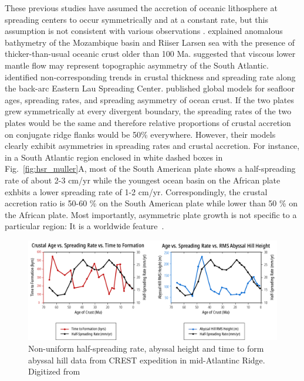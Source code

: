 \documentclass[letterpaper,12pt,notitle]{memphisthesis}                     %
\begin{document}
These previous studies have assumed the accretion of oceanic lithosphere at spreading centers to occur symmetrically and at a constant rate, but this assumption is not consistent with various observations \citep{Castelino2016, Flament2014, Martinez2006, Muller1998, Muller2008, Fedotova2017}. \citet{Castelino2016} explained anomalous bathymetry of the Mozambique basin and Riiser Larsen sea with the presence of thicker-than-usual oceanic crust older than 100 Ma. \citet{Flament2014} suggested that viscous lower mantle flow may represent topographic asymmetry of the South Atlantic. \citet{Martinez2006} identified non-corresponding trends in crustal thickness and spreading rate along the back-arc Eastern Lau Spreading Center. \citet{Muller2008} published global models for seafloor ages, spreading rates, and spreading asymmetry of ocean crust. If the two plates grew symmetrically at every divergent boundary, the spreading rates of the two plates would be the same and therefore relative proportions of crustal accretion on conjugate ridge flanks would be 50\% everywhere. However, their models clearly exhibit asymmetries in spreading rates and crustal accretion. For instance, in a South Atlantic region enclosed in white dashed boxes in Fig.~\ref{fig:hsr_muller}A, most of the South American plate shows a half-spreading rate of about 2-3 cm/yr while the youngest ocean basin on the African plate exhbits a lower spreading rate of 1-2 cm/yr. Correspondingly, the crustal accretion ratio is 50-60 \% on the South American plate while lower than 50 \% on the African plate. Most importantly, asymmetric plate growth is not specific to a particular region: It is a worldwide feature~\citep{Muller2008}.
%
\begin{figure}[!htb]
	\centering
	\includegraphics[width=0.99\linewidth]{./figs/hsrgraph1.pdf}
	\caption{Non-uniform half-spreading rate, abyssal height and time to form abyssal hill data from CREST expedition in mid-Atlantinc Ridge. Digitized from \citet{Fedotova2017}}
	\label{fig:hsr_fedotova}
\end{figure}
\end{document}
